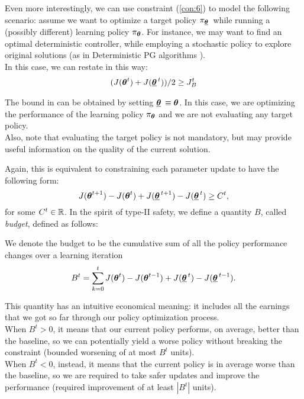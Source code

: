 Even more interestingly, we can use constraint (\ref{con:6}) to model the following scenario: assume we want to optimize a target policy $\pi_{\vtarget[]}$ while running a (possibly different) learning policy $\pi_{\vtheta}$. For instance, we may want to find an optimal deterministic controller, while employing a stochastic policy to explore original solutions (as in Deterministic PG algorithms \cite{silver2014deterministic}). \\
In this case, we can restate  in this way:
\begin{align}\label{con:6target}
(J(\vtheta^t) + J(\vtarget))/2 \geq \jbase
\end{align}

\begin{note}
The bound in  can be obtained by setting $\vtarget[] \equiv \vtheta$. In this case, we are optimizing the performance of the learning policy $\pi_{\vtheta}$ and we are not evaluating any target policy.\\
Also, note that evaluating the target policy is not mandatory, but may provide useful information on the quality of the current solution.
\end{note}

Again, this is equivalent to constraining each parameter update to have the following form:
\begin{equation}\label{con:type2}
J(\vtheta^{t+1}) - J(\vtheta^{t}) + J(\vtarget[t+1]) - J(\vtarget) \geq C^t,
\end{equation}
for some $C^t\in \realspace$.
%
In the spirit of type-II safety, we define a quantity $B$, called \textit{budget}, defined as follows:
\begin{definition}[Budget] We denote the budget to be the cumulative sum of all the policy performance changes over a learning iteration
\begin{equation}\label{eq:budget}
B^t =  \sum_{k=0}^{t} J(\vtheta^t) - J(\vtheta^{t-1}) + J(\vtarget) - J(\vtarget[t-1]).
\end{equation}
\end{definition}
This quantity has an intuitive economical meaning: it includes all the earnings that we got so far through our policy optimization process.\\ 
When $B^t > 0$, it means that our current policy performs, on average, better than the baseline, so we can potentially yield a worse policy without breaking the constraint (bounded worsening of at most $B^t$ units).\\
When $B^t<0$, instead, it means that the current policy is in average worse than the baseline, so we are required to take safer updates and improve the performance (required improvement of at least $|B^t|$ units). 


